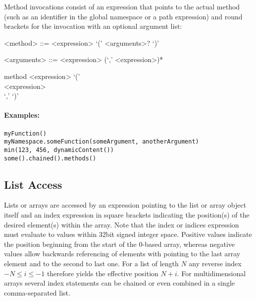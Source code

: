 \documentclass[11pt,a4paper]{report}
\begin{document}
Method invocations consist of an expression that points to the actual method (such as an identifier in the global namespace or a path expression) and round brackets for the invocation with an optional argument list:

\begin{gram}
	\label{gram:method-invocation}
	\begin{grammar}	
		<method> ::= <expression> `(' <arguments>? `)'
		
		<arguments> ::= <expression> (`,' <expression>)*	
	\end{grammar}
	\diagsep
	
	\begin{rrdiag*}{method}
		<expression> `(' \sst \\ \srp <expression> \\ `,' \erp \est `)'
	\end{rrdiag*}
\end{gram}

\paragraph{Examples:}

\begin{Verbatim}[samepage=true]
myFunction()
myNamespace.someFunction(someArgument, anotherArgument)
min(123, 456, dynamicContent())
some().chained().methods()
\end{Verbatim}

\subsection{List Access}
\label{sec:list-access}

Lists or arrays are accessed by an expression pointing to the list or array object itself and an index expression in square brackets indicating the position(s) of the desired element(s) within the array. Note that the index or indices expression must evaluate to values within 32bit signed integer space. Positive values indicate the position beginning from the start of the 0-based array, whereas negative values allow backwards referencing of elements with  pointing to the last array element and  to the second to last one. For a list of length $N$ any reverse index $-N \le i \le -1$ therefore yields the effective position $N+i$. For multidimensional arrays several index statements can be chained or even combined in a single comma-separated list.
\end{document}
